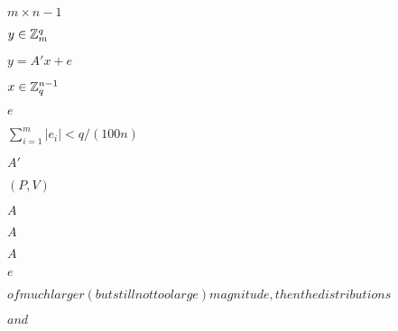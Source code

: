 \documentclass[10pt]{book}
\begin{document}
\begin{mdSnippets}
\begin{mdInlineSnippet}[7acc4db08f56971b481176601dc952be]%
$m\times n-1$\end{mdInlineSnippet}%
\begin{mdInlineSnippet}%
$y\in \mathbb{Z}^q_m$\end{mdInlineSnippet}%
\begin{mdInlineSnippet}%
$y = A'x+e$\end{mdInlineSnippet}%
\begin{mdInlineSnippet}[72294ec9d1b72c89a42022c90a8eae3f]%
$x\in\mathbb{Z}_q^{n-1}$\end{mdInlineSnippet}%
\begin{mdInlineSnippet}[e1671797c52e15f763380b45e841ec32]%
$e$\end{mdInlineSnippet}%
\begin{mdInlineSnippet}[636e395aa5af33b23fe5c1d14cce3e17]%
$\sum_{i=1}^m |e_i| < q/(100n)$\end{mdInlineSnippet}%
\begin{mdInlineSnippet}[37a12b78a9ca96989ad7ceceacb37ea2]%
$A'$\end{mdInlineSnippet}%
\begin{mdInlineSnippet}[912e5c0903d34af49ea5488c8dfb2476]%
$(P,V)$\end{mdInlineSnippet}%
\begin{mdInlineSnippet}[7fc56270e7a70fa81a5935b72eacbe29]%
$A$\end{mdInlineSnippet}%
\begin{mdInlineSnippet}[7fc56270e7a70fa81a5935b72eacbe29]%
$A$\end{mdInlineSnippet}%
\begin{mdInlineSnippet}[7fc56270e7a70fa81a5935b72eacbe29]%
$A$\end{mdInlineSnippet}%
\begin{mdInlineSnippet}[e1671797c52e15f763380b45e841ec32]%
$e$\end{mdInlineSnippet}%
\begin{mdInlineSnippet}[83cfb44b48f176bd596577d14a79c78c]%
$ of much larger (but still not too large) magnitude, then the distributions $\end{mdInlineSnippet}%
\begin{mdInlineSnippet}[0060636b449d1da5a8581bfee180f0c2]%
$ and $\end{mdInlineSnippet}%

\end{mdSnippets}
\end{document}

